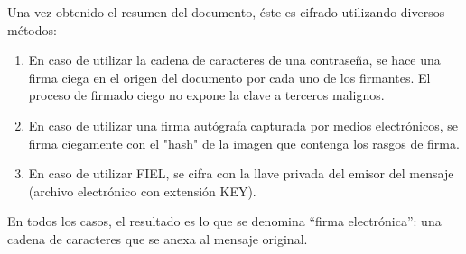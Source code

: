 \documentclass[letterpaper, 12pt]{article}
\begin{document}
Una vez obtenido el resumen del documento, éste es cifrado utilizando diversos métodos:
\begin{enumerate}
\item En caso de utilizar la cadena de caracteres de una contraseña, se hace una firma ciega en el origen del documento por cada uno de los firmantes. El proceso de firmado ciego no expone la clave a terceros malignos.
\item En caso de utilizar una firma autógrafa capturada por medios electrónicos, se firma ciegamente con el "hash" de la imagen que contenga los rasgos de firma.
\item En caso de utilizar FIEL, se cifra con la llave privada del emisor del mensaje (archivo electrónico con extensión KEY).
\end{enumerate}

En todos los casos, el resultado es lo que se denomina ``firma electrónica'': una cadena de caracteres que se anexa al mensaje original.  

\subsection{}

	

\clearpage



\end{document}
